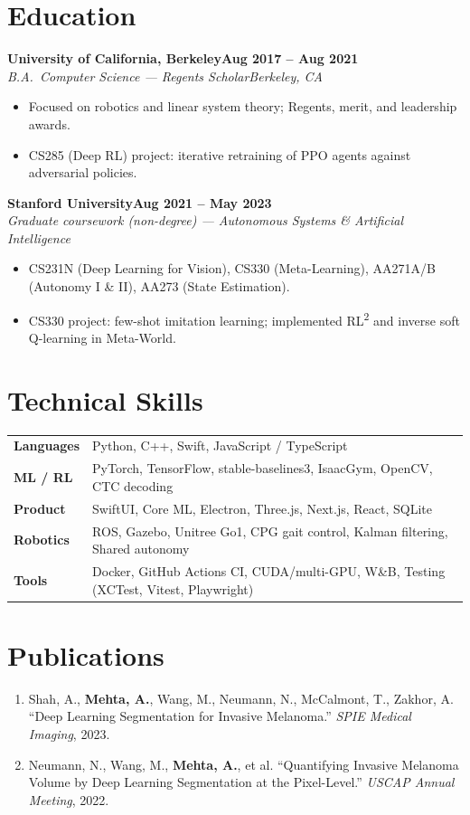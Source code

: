 \documentclass[10pt]{article}
\newcommand{\role}[4]{\textbf{#1}\hfill\textbf{#2}\\\textit{#3}\hfill\textit{#4}}
\begin{document}
\section*{Education}

\role{University of California, Berkeley}{Aug 2017 -- Aug 2021}{B.A.\ Computer Science --- Regents Scholar}{Berkeley, CA}
\begin{itemize}
\item Focused on robotics and linear system theory; Regents, merit, and leadership awards.
\item CS285 (Deep RL) project: iterative retraining of PPO agents against adversarial policies.
\end{itemize}

\role{Stanford University}{Aug 2021 -- May 2023}{Graduate coursework (non-degree) --- Autonomous Systems \& Artificial Intelligence}{}
\begin{itemize}
\item CS231N (Deep Learning for Vision), CS330 (Meta-Learning), AA271A/B (Autonomy I \& II), AA273 (State Estimation).
\item CS330 project: few-shot imitation learning; implemented RL\textsuperscript{2} and inverse soft Q-learning in Meta-World.
\end{itemize}

\section*{Technical Skills}
\begin{tabular}{@{}p{0.9in}l}
\textbf{Languages} & Python, C++, Swift, JavaScript / TypeScript \\
\textbf{ML / RL} & PyTorch, TensorFlow, stable-baselines3, IsaacGym, OpenCV, CTC decoding \\
\textbf{Product} & SwiftUI, Core ML, Electron, Three.js, Next.js, React, SQLite \\
\textbf{Robotics} & ROS, Gazebo, Unitree Go1, CPG gait control, Kalman filtering, Shared autonomy \\
\textbf{Tools} & Docker, GitHub Actions CI, CUDA/multi-GPU, W\&B, Testing (XCTest, Vitest, Playwright) \\
\end{tabular}

\section*{Publications}
\begin{enumerate}[leftmargin=1.4em,itemsep=1pt,topsep=1pt]
\item Shah, A., \textbf{Mehta, A.}, Wang, M., Neumann, N., McCalmont, T., Zakhor, A. ``Deep Learning Segmentation for Invasive Melanoma.'' \textit{SPIE Medical Imaging}, 2023.
\item Neumann, N., Wang, M., \textbf{Mehta, A.}, et al. ``Quantifying Invasive Melanoma Volume by Deep Learning Segmentation at the Pixel-Level.'' \textit{USCAP Annual Meeting}, 2022.
\end{enumerate}
\end{document}
